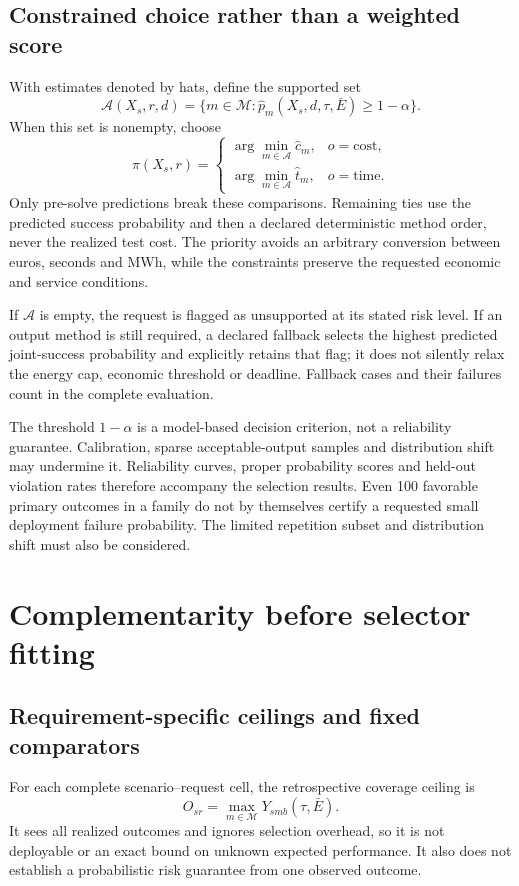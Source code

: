 \subsection{Constrained choice rather than a weighted score}
With estimates denoted by hats, define the supported set
\begin{equation}
 \mathcal A(X_s,r,d)=
 \{m\in\mathcal M:\widehat p_m(X_s,d,\tau,\bar E)\geq1-\alpha\}.
\end{equation}
When this set is nonempty, choose
\begin{equation}
 \pi(X_s,r)=
 \begin{cases}
 \displaystyle\arg\min_{m\in\mathcal A}\widehat c_m,
       & o=\text{cost},\\[3pt]
 \displaystyle\arg\min_{m\in\mathcal A}\widehat t_m,
       & o=\text{time}.
 \end{cases}
 \label{eq:selection}
\end{equation}
Only pre-solve predictions break these comparisons. Remaining ties use the
predicted success probability and then a declared deterministic method order,
never the realized test cost. The priority avoids an arbitrary conversion
between euros, seconds and MWh, while the constraints preserve the requested
economic and service conditions.

If $\mathcal A$ is empty, the request is flagged as unsupported at its stated
risk level. If an output method is still required, a declared fallback selects
the highest predicted joint-success probability and explicitly retains that
flag; it does not silently relax the energy cap, economic threshold or
deadline. Fallback cases and their failures count in the complete evaluation.

The threshold $1-\alpha$ is a model-based decision criterion, not a reliability
guarantee. Calibration, sparse acceptable-output samples and distribution
shift may undermine it. Reliability curves, proper probability scores and
held-out violation rates therefore accompany the selection results.
Even 100 favorable primary outcomes in a family do not by themselves
certify a requested small deployment failure probability. The limited
repetition subset and distribution shift must also be considered.

\section{Complementarity before selector fitting}
\subsection{Requirement-specific ceilings and fixed comparators}
For each complete scenario--request cell, the retrospective coverage ceiling is
\begin{equation}
 O_{sr}=\max_{m\in\mathcal M}Y_{smb}(\tau,\bar E).
\end{equation}
It sees all realized outcomes and ignores selection overhead, so it is not
deployable or an exact bound on unknown expected performance. It also does
not establish a probabilistic risk guarantee from one observed outcome.

